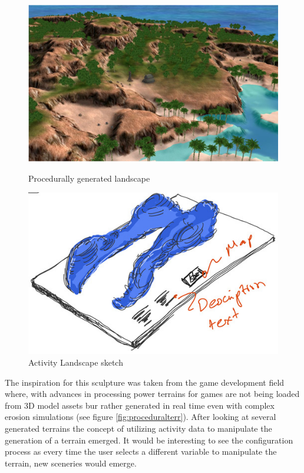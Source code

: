 \documentclass[../medieninformatik-arbeit.tex]{subfiles}
\begin{document}
\begin{figure}[h]
\centering
\begin{minipage}{.45\textwidth}
\centering
	\includegraphics[width=\linewidth]{Prototype/img/terrain}
	\caption{Procedurally generated landscape \ \cite{olsen2004realtime}}
	\label{fig:proceduralterr}
\end{minipage}
\begin{minipage}{.45\textwidth}
\centering
  \includegraphics[width=0.88\linewidth]{Prototype/img/ActivityLandscape_detail}
  \caption{Activity Landscape sketch}
  \label{fig:activitylandscape}
\end{minipage}
\end{figure}

The inspiration for this sculpture was taken from the game development field where, with advances in processing power terrains for games are not being loaded from 3D model assets bur rather generated in real time even with complex erosion simulations \cite{olsen2004realtime} (see figure \ref{fig:proceduralterr}). After looking at several generated terrains the concept of utilizing activity data to manipulate the generation of a terrain emerged. It would be interesting to see the configuration process as every time the user selects a different variable to manipulate the terrain, new sceneries would emerge.
\end{document}
